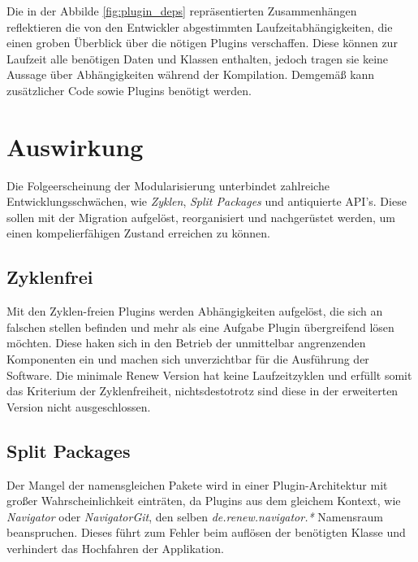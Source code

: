 Die in der Abbilde \ref{fig:plugin_deps} repräsentierten Zusammenhängen reflektieren die von den Entwickler abgestimmten Laufzeitabhängigkeiten, die einen groben Überblick über die nötigen Plugins verschaffen. Diese können zur Laufzeit alle benötigen Daten und Klassen enthalten, jedoch tragen sie keine Aussage über Abhängigkeiten während der Kompilation. Demgemäß kann zusätzlicher Code sowie Plugins benötigt werden. 


\section{Auswirkung} \label{auswirkung}
Die Folgeerscheinung der Modularisierung unterbindet zahlreiche Entwicklungsschwächen, wie \textit{Zyklen}, \textit{Split Packages} und antiquierte API's. Diese sollen mit der Migration aufgelöst, reorganisiert und nachgerüstet werden, um einen kompelierfähigen Zustand erreichen zu können.

\subsection{Zyklenfrei} 
Mit den Zyklen-freien Plugins werden Abhängigkeiten aufgelöst, die sich an falschen stellen befinden und mehr als eine Aufgabe Plugin übergreifend lösen möchten. Diese haken sich in den Betrieb der unmittelbar angrenzenden Komponenten ein und machen sich unverzichtbar für die Ausführung der Software. Die minimale Renew Version hat keine Laufzeitzyklen und erfüllt somit das Kriterium der Zyklenfreiheit, nichtsdestotrotz sind diese in der erweiterten Version nicht ausgeschlossen.

\subsection{Split Packages}
Der Mangel der namensgleichen Pakete wird in einer Plugin-Architektur mit großer Wahrscheinlichkeit einträten, da Plugins aus dem gleichem Kontext, wie \textit{Navigator} oder \textit{NavigatorGit}, den selben \textit{de.renew.navigator.*} Namensraum beanspruchen. Dieses führt zum Fehler beim auflösen der benötigten Klasse und verhindert das Hochfahren der Applikation. 

